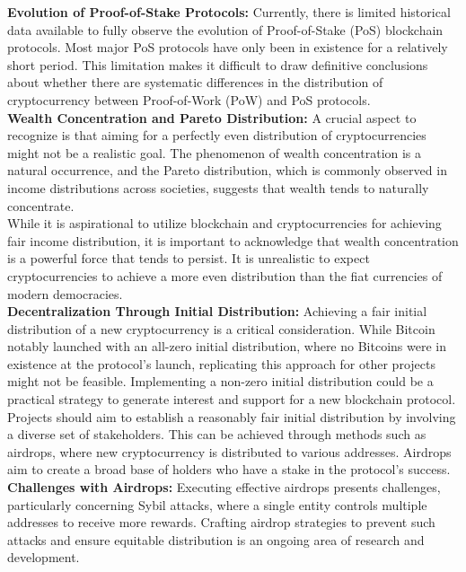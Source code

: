 \noindent
\textbf{Evolution of Proof-of-Stake Protocols:} Currently, there is limited historical data available to fully observe the evolution of Proof-of-Stake (PoS) blockchain protocols. Most major PoS protocols have only been in existence for a relatively short period. This limitation makes it difficult to draw definitive conclusions about whether there are systematic differences in the distribution of cryptocurrency between Proof-of-Work (PoW) and PoS protocols.\\

\noindent
\textbf{Wealth Concentration and Pareto Distribution:} A crucial aspect to recognize is that aiming for a perfectly even distribution of cryptocurrencies might not be a realistic goal. The phenomenon of wealth concentration is a natural occurrence, and the Pareto distribution, which is commonly observed in income distributions across societies, suggests that wealth tends to naturally concentrate.\\
While it is aspirational to utilize blockchain and cryptocurrencies for achieving fair income distribution, it is important to acknowledge that wealth concentration is a powerful force that tends to persist. It is unrealistic to expect cryptocurrencies to achieve a more even distribution than the fiat currencies of modern democracies.\\

\noindent
\textbf{Decentralization Through Initial Distribution:} Achieving a fair initial distribution of a new cryptocurrency is a critical consideration. While Bitcoin notably launched with an all-zero initial distribution, where no Bitcoins were in existence at the protocol's launch, replicating this approach for other projects might not be feasible. Implementing a non-zero initial distribution could be a practical strategy to generate interest and support for a new blockchain protocol.\\
Projects should aim to establish a reasonably fair initial distribution by involving a diverse set of stakeholders. This can be achieved through methods such as airdrops, where new cryptocurrency is distributed to various addresses. Airdrops aim to create a broad base of holders who have a stake in the protocol's success.\\

\noindent
\textbf{Challenges with Airdrops:} Executing effective airdrops presents challenges, particularly concerning Sybil attacks, where a single entity controls multiple addresses to receive more rewards. Crafting airdrop strategies to prevent such attacks and ensure equitable distribution is an ongoing area of research and development.

